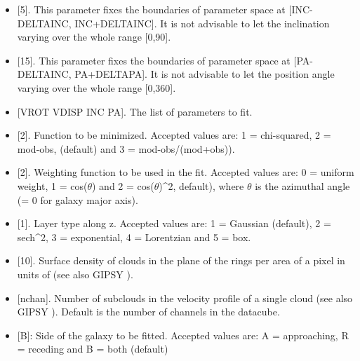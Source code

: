 \documentclass[letterpaper,10pt,english]{sphinxmanual}
\begin{document}
\begin{itemize}
\item {} 
 {[}5{]}. This parameter fixes the boundaries of parameter space at {[}INC-DELTAINC, INC+DELTAINC{]}. It is not advisable to let the inclination varying over the whole range {[}0,90{]}.

\item {} 
 {[}15{]}. This parameter fixes the boundaries of parameter space at {[}PA-DELTAINC, PA+DELTAPA{]}. It is not advisable to let the position angle varying over the whole range {[}0,360{]}.

\item {} 
 {[}VROT VDISP INC PA{]}. The list of parameters to fit.

\item {} 
 {[}2{]}. Function to be minimized. Accepted values are: 1 = chi-squared, 2 = \textbar{}mod-obs\textbar{}, (default) and 3 = \textbar{}mod-obs\textbar{}/(mod+obs)).

\item {} 
 {[}2{]}. Weighting function to be used in the fit. Accepted values are: 0 = uniform weight, 1 = \textbar{}cos(\(\theta\))\textbar{} and 2 = cos(\(\theta\))\textasciicircum{}2, default), where \(\theta\) is the azimuthal angle (= 0 for galaxy major axis).

\item {} 
 {[}1{]}. Layer type along z. Accepted values are: 1 = Gaussian (default), 2  = sech\textasciicircum{}2, 3 = exponential, 4 = Lorentzian and 5 = box.

\item {} 
 {[}10{]}. Surface density of clouds in the plane of the rings per area of a pixel in units of  (see also GIPSY ).

\item {} 
 {[}nchan{]}. Number of subclouds in the velocity profile of a single cloud (see also GIPSY ). Default is the number of channels in the datacube.

\item {} 
 {[}B{]}: Side of the galaxy to be fitted. Accepted values are: A = approaching, R = receding and B = both (default)


\end{itemize}
\end{document}
